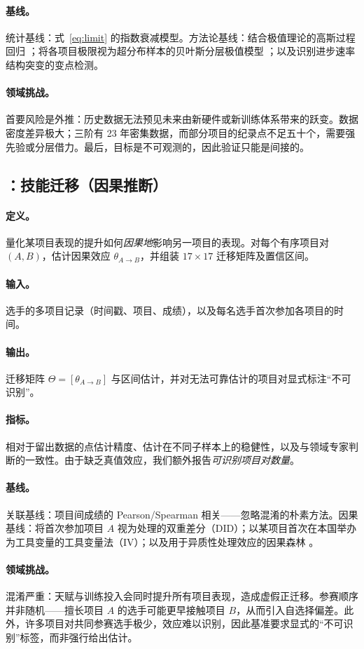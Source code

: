 \paragraph{基线。}统计基线：式~\ref{eq:limit} 的指数衰减模型。方法论基线：结合极值理论的高斯过程回归 \citep{evt_coles}；将各项目极限视为超分布样本的贝叶斯分层极值模型 \citep{bayesian_hierarchical}；以及识别进步速率结构突变的变点检测。

\paragraph{领域挑战。}首要风险是外推：历史数据无法预见未来由新硬件或新训练体系带来的跃变。数据密度差异极大；三阶有 23 年密集数据，而部分项目的纪录点不足五十个，需要强先验或分层借力。最后，目标是不可观测的，因此验证只能是间接的。

\subsection{：技能迁移（因果推断）}
\label{sec:task5}

\paragraph{定义。}量化某项目表现的提升如何\emph{因果地}影响另一项目的表现。对每个有序项目对 $(A, B)$，估计因果效应 $\theta_{A \to B}$，并组装 $17 \times 17$ 迁移矩阵及置信区间。

\paragraph{输入。}选手的多项目记录（时间戳、项目、成绩），以及每名选手首次参加各项目的时间。

\paragraph{输出。}迁移矩阵 $\Theta = [\theta_{A \to B}]$ 与区间估计，并对无法可靠估计的项目对显式标注“不可识别”。

\paragraph{指标。}相对于留出数据的点估计精度、估计在不同子样本上的稳健性，以及与领域专家判断的一致性。由于缺乏真值效应，我们额外报告\emph{可识别项目对数量}。

\paragraph{基线。}关联基线：项目间成绩的 Pearson/Spearman 相关——忽略混淆的朴素方法。因果基线：将首次参加项目 $A$ 视为处理的双重差分（DID）\citep{did}；以某项目首次在本国举办为工具变量的工具变量法（IV）\citep{iv}；以及用于异质性处理效应的因果森林 \citep{causal_forest}。

\paragraph{领域挑战。}混淆严重：天赋与训练投入会同时提升所有项目表现，造成虚假正迁移。参赛顺序并非随机——擅长项目 $A$ 的选手可能更早接触项目 $B$，从而引入自选择偏差。此外，许多项目对共同参赛选手极少，效应难以识别，因此基准要求显式的“不可识别”标签，而非强行给出估计。
